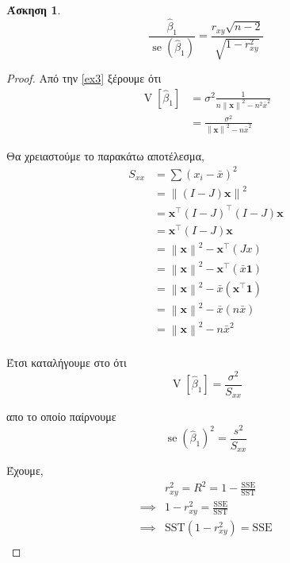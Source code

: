 \documentclass{article}
\DeclareMathOperator{\V}{\mathrm{V}}
\DeclareMathOperator{\se}{\mathrm{se}}
\newcommand{\norm}[1]{\left\| #1 \right\|}
\newcommand{\T}[1]{{#1}^{\top}}  %
\newcommand{\SSE}{\mathrm{SSE}}
\newcommand{\SST}{\mathrm{SST}}
\newcommand{\hb}{\hat{\beta}}
\newcommand{\ve}[1]{\boldsymbol{#1}}
\newtheorem{exercise}{Άσκηση}[section]
\begin{document}
\begin{exercise}
    \begin{equation*}
        \frac{\hb_1}{\se(\hb_1)} = \frac{r_{xy} \sqrt{n-2}}{\sqrt{1 - r_{xy}^2}}
    \end{equation*}
\end{exercise}
\begin{proof}

    Από την \ref{ex3} ξέρουμε ότι
    \begin{equation*}
    \begin{split}
        \V[\hb_1] &= \sigma^2 \frac{1}{n \norm{\ve{x}}^2 - n^2 \bar{x}^2}\\
        &=\frac{\sigma^2}{\norm{\ve{x}}^2 - n \bar{x}^2}
    \end{split}
    \end{equation*}
    
    Θα χρειαστούμε το παρακάτω αποτέλεσμα,
    \begin{equation*} 
    \begin{split}
        S_{xx} &= \sum \left( x_i - \bar{x} \right)^2\\
        &= \norm{(I - J)\ve{x}}^2\\
        &= \T{\ve{x}} \T{(I - J)} (I - J) \ve{x}\\
        &= \T{\ve{x}} (I - J) \ve{x}\\
        &= \norm{\ve{x}}^2 - \T{\ve{x}} \left( J x \right)\\
        &= \norm{\ve{x}}^2 - \T{\ve{x}} (\bar{x} \ve{1})\\
        &= \norm{\ve{x}}^2 - \bar{x} (\T{\ve{x}} \ve{1})\\
        &= \norm{\ve{x}}^2 - \bar{x} (n \bar{x})\\
        &= \norm{\ve{x}}^2 - n \bar{x}^2\\
    \end{split}
    \end{equation*}

    Έτσι καταλήγουμε στο ότι
    \begin{equation*}
        \V[\hb_1] = \frac{\sigma^2}{S_{xx}}
    \end{equation*}

    απο το οποίο παίρνουμε
    \begin{equation*} 
        \se(\hb_1)^2 = \frac{s^2}{S_{xx}}
    \end{equation*}

    Έχουμε,
    \begin{equation*} \tag{*} \label{eqn}
    \begin{split}
        &r_{xy}^2 = R^2 = 1 - \frac{\SSE}{\SST}\\
        \implies& 1 - r_{xy}^2 = \frac{\SSE}{\SST}\\
        \implies& \SST \left( 1 - r_{xy}^2 \right) = \SSE\\
    \end{split}
    \end{equation*}


\end{proof}
\end{document}
